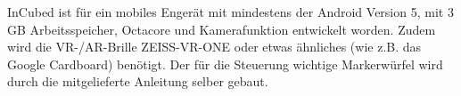 
InCubed ist für ein mobiles Engerät mit mindestens der Android Version 5, mit 3 GB Arbeitsspeicher, Octacore und Kamerafunktion entwickelt worden. Zudem wird die VR-/AR-Brille ZEISS-VR-ONE oder etwas ähnliches (wie z.B. das Google Cardboard) benötigt. Der für die Steuerung wichtige Markerwürfel wird durch die mitgelieferte Anleitung selber gebaut.